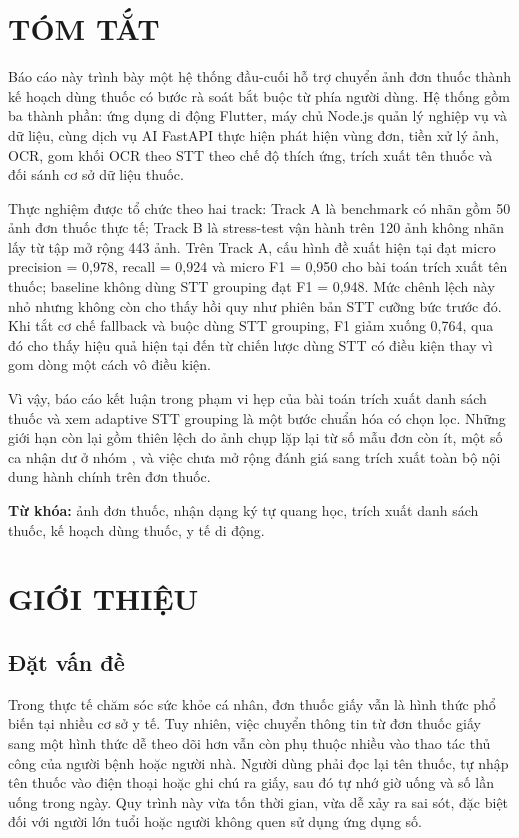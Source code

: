\documentclass[12pt,a4paper]{report}
\begin{document}
\clearpage
{}
\chapter*{TÓM TẮT}

Báo cáo này trình bày một hệ thống đầu-cuối hỗ trợ chuyển ảnh đơn thuốc thành kế hoạch dùng thuốc có bước rà soát bắt buộc từ phía người dùng. Hệ thống gồm ba thành phần: ứng dụng di động Flutter, máy chủ Node.js quản lý nghiệp vụ và dữ liệu, cùng dịch vụ AI FastAPI thực hiện phát hiện vùng đơn, tiền xử lý ảnh, OCR, gom khối OCR theo STT theo chế độ thích ứng, trích xuất tên thuốc và đối sánh cơ sở dữ liệu thuốc.

Thực nghiệm được tổ chức theo hai track: Track A là benchmark có nhãn gồm 50 ảnh đơn thuốc thực tế; Track B là stress-test vận hành trên 120 ảnh không nhãn lấy từ tập mở rộng 443 ảnh. Trên Track A, cấu hình đề xuất hiện tại đạt micro precision = 0,978, recall = 0,924 và micro F1 = 0,950 cho bài toán trích xuất tên thuốc; baseline không dùng STT grouping đạt F1 = 0,948. Mức chênh lệch này nhỏ nhưng không còn cho thấy hồi quy như phiên bản STT cưỡng bức trước đó. Khi tắt cơ chế fallback và buộc dùng STT grouping, F1 giảm xuống 0,764, qua đó cho thấy hiệu quả hiện tại đến từ chiến lược dùng STT có điều kiện thay vì gom dòng một cách vô điều kiện.

Vì vậy, báo cáo kết luận trong phạm vi hẹp của bài toán trích xuất danh sách thuốc và xem adaptive STT grouping là một bước chuẩn hóa có chọn lọc. Những giới hạn còn lại gồm thiên lệch do ảnh chụp lặp lại từ số mẫu đơn còn ít, một số ca nhận dư ở nhóm , và việc chưa mở rộng đánh giá sang trích xuất toàn bộ nội dung hành chính trên đơn thuốc.

\noindent\textbf{Từ khóa:} ảnh đơn thuốc, nhận dạng ký tự quang học, trích xuất danh sách thuốc, kế hoạch dùng thuốc, y tế di động.

\clearpage
{}

\chapter{GIỚI THIỆU}

\section{Đặt vấn đề}

Trong thực tế chăm sóc sức khỏe cá nhân, đơn thuốc giấy vẫn là hình thức phổ biến tại nhiều cơ sở y tế. Tuy nhiên, việc chuyển thông tin từ đơn thuốc giấy sang một hình thức dễ theo dõi hơn vẫn còn phụ thuộc nhiều vào thao tác thủ công của người bệnh hoặc người nhà. Người dùng phải đọc lại tên thuốc, tự nhập tên thuốc vào điện thoại hoặc ghi chú ra giấy, sau đó tự nhớ giờ uống và số lần uống trong ngày. Quy trình này vừa tốn thời gian, vừa dễ xảy ra sai sót, đặc biệt đối với người lớn tuổi hoặc người không quen sử dụng ứng dụng số.
\end{document}
